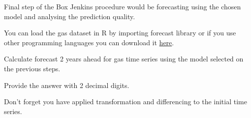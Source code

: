 
\begin{question}
Final step of the Box Jenkins procedure would be forecasting using the chosen model and analysing the prediction quality.

You can load the gas dataset in R by importing forecast library or if you use other programming languages you can download it \href{https://github.com/vincentarelbundock/Rdatasets/blob/master/csv/forecast/gas.csv}{here}.

Calculate forecast 2 years ahead for gas time series using the model selected on the previous steps.

Provide the answer with 2 decimal digits.
\end{question}

\begin{solution}
Don't forget you have applied transformation and differencing to the initial time series.
\end{solution}

